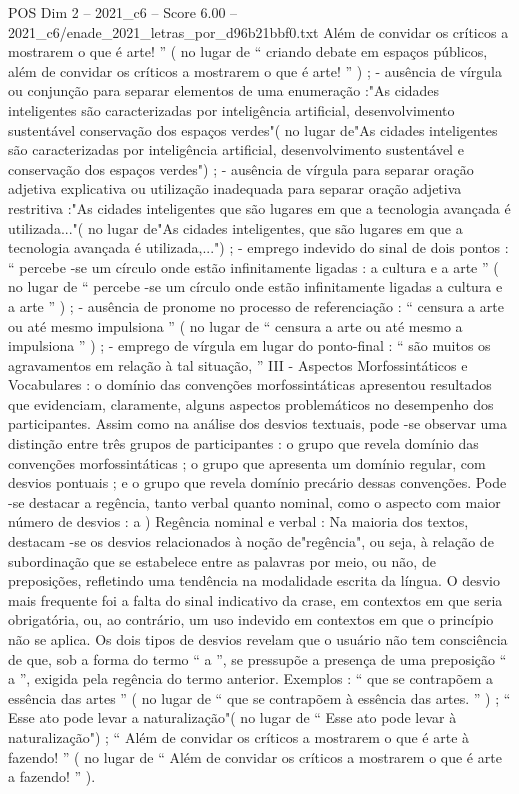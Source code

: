 \begin{textsample}{POS Dim 2 – 2021\_c6 – Score 6.00 – 2021\_c6/enade\_2021\_letras\_por\_d96b21bbf0.txt}
Além de convidar os críticos a mostrarem o que é arte! ” ( no lugar de “ criando debate em espaços públicos, além de convidar os críticos a mostrarem o que é arte! ” ) ; - ausência de vírgula ou conjunção para separar elementos de uma enumeração :"As cidades inteligentes são caracterizadas por inteligência artificial, desenvolvimento sustentável conservação dos espaços verdes"( no lugar de"As cidades inteligentes são caracterizadas por inteligência artificial, desenvolvimento sustentável e conservação dos espaços verdes") ; - ausência de vírgula para separar oração adjetiva explicativa ou utilização inadequada para separar oração adjetiva restritiva :"As cidades inteligentes que são lugares em que a tecnologia avançada é utilizada..."( no lugar de"As cidades inteligentes, que são lugares em que a tecnologia avançada é utilizada,...") ; - emprego indevido do sinal de dois pontos : “ percebe -se um círculo onde estão infinitamente ligadas : a cultura e a arte ” ( no lugar de “ percebe -se um círculo onde estão infinitamente ligadas a cultura e a arte ” ) ; - ausência de pronome no processo de referenciação : “ censura a arte ou até mesmo impulsiona ” ( no lugar de “ censura a arte ou até mesmo a impulsiona ” ) ; - emprego de vírgula em lugar do ponto-final : “ são muitos os agravamentos em relação à tal situação, ” III - Aspectos Morfossintáticos e Vocabulares : o domínio das convenções morfossintáticas apresentou resultados que evidenciam, claramente, alguns aspectos problemáticos no desempenho dos participantes.
Assim como na análise dos desvios textuais, pode -se observar uma distinção entre três grupos de participantes : o grupo que revela domínio das convenções morfossintáticas ; o grupo que apresenta um domínio regular, com desvios pontuais ; e o grupo que revela domínio precário dessas convenções.
Pode -se destacar a regência, tanto verbal quanto nominal, como o aspecto com maior número de desvios : a ) Regência nominal e verbal : Na maioria dos textos, destacam -se os desvios relacionados à noção de"regência", ou seja, à relação de subordinação que se estabelece entre as palavras por meio, ou não, de preposições, refletindo uma tendência na modalidade escrita da língua.
O desvio mais frequente foi a falta do sinal indicativo da crase, em contextos em que seria obrigatória, ou, ao contrário, um uso indevido em contextos em que o princípio não se aplica.
Os dois tipos de desvios revelam que o usuário não tem consciência de que, sob a forma do termo “ a ”, se pressupõe a presença de uma preposição “ a ”, exigida pela regência do termo anterior.
Exemplos : “ que se contrapõem a essência das artes ” ( no lugar de “ que se contrapõem à essência das artes. ” ) ; “ Esse ato pode levar a naturalização"( no lugar de “ Esse ato pode levar à naturalização") ; “ Além de convidar os críticos a mostrarem o que é arte à fazendo! ” ( no lugar de “ Além de convidar os críticos a mostrarem o que é arte a fazendo! ” ).

\end{textsample}
